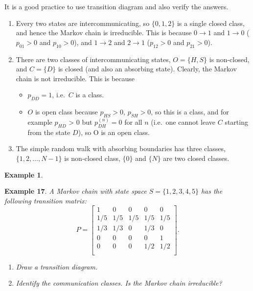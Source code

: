 \documentclass[
]{book}
\theoremstyle{definition}
\theoremstyle{definition}
\newtheorem{example}{Example}[chapter]
\theoremstyle{definition}
\theoremstyle{definition}
\theoremstyle{remark}
\begin{document}
It is a good practice to use transition diagram and also verify the
answers.

\begin{enumerate}
\def\labelenumi{(\alph{enumi})}
\item
  Every two states are intercommunicating, so \(\{0,1,2\}\) is a single
  closed class, and hence the Markov chain is irreducible. This is
  because \(0 \rightarrow 1\) and \(1 \rightarrow 0\) (\(p_{01} > 0\) and
  \(p_{10} > 0\)), and \(1 \rightarrow 2\) and \(2 \rightarrow 1\)
  (\(p_{12} > 0\) and \(p_{21} > 0\)).
\item
  There are two classes of intercommunicating states, \(O = \{H,S\}\) is
  non-closed, and \(C = \{ D \}\) is closed (and also an absorbing
  state). Clearly, the Markov chain is not irreducible. This is
  because

  \begin{itemize}
  \item
    \(p_{DD} = 1\), i.e.~\(C\) is a class.
  \item
    \(O\) is open class because \(p_{HS} > 0\), \(p_{SH} >0\), so this is
    a class, and for example \(p_{HD}\) \textgreater{} 0 but \(p^{(n)}_{DH} = 0\)
    for all \(n\) (i.e.~one cannot leave \(C\) starting from the state
    \(D\)), so O is an open class.
  \end{itemize}
\item
  The simple random walk with absorbing boundaries has three classes,
  \(\{1,2, \ldots, N-1 \}\) is non-closed class, \(\{0 \}\) and \(\{N \}\)
  are two closed classes.
\end{enumerate}

\begin{example}
\protect\hypertarget{exm:exampleMC}{}\label{exm:exampleMC}

\textbf{Example 17}. \emph{A Markov chain with state space \(S = \{1,2,3,4,5\}\) has
the following transition matrix: \[P = \begin{bmatrix}
    1 & 0 & 0 & 0 & 0     \\
    1/5 & 1/5 & 1/5 & 1/5 & 1/5   \\
    1/3 & 1/3 & 0 & 1/3 & 0     \\
0 & 0 & 0 & 0 & 1     \\
0 & 0 & 0 & 1/2 & 1/2     \\
\end{bmatrix}.\]}

\begin{enumerate}
\def\labelenumi{\arabic{enumi}.}
\item
  \emph{Draw a transition diagram.}
\item
  \emph{Identify the communication classes. Is the Markov chain
  irreducible?}
\end{enumerate}

\end{example}
\end{document}

